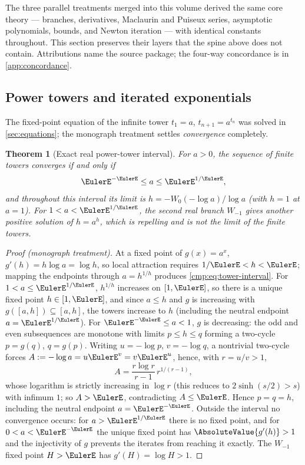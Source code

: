 \documentclass[11pt]{article}
\newtheorem{theorem}{Theorem}[section]
\theoremstyle{remark}
\begin{document}
The three parallel treatments merged into this volume derived the same core
theory --- branches, derivatives, Maclaurin and Puiseux series, asymptotic
polynomials, bounds, and Newton iteration --- with identical constants
throughout.  This section preserves their layers that the spine above does
not contain.  Attributions name the source package; the four-way concordance
is in \cref{app:concordance}.

\subsection{Power towers and iterated exponentials}

The fixed-point equation of the infinite tower
\(t_1=a\), \(t_{n+1}=a^{t_n}\) was solved in
\cref{sec:equations}; the monograph treatment settles \emph{convergence}
completely.

\begin{theorem}[Exact real power-tower interval]\label{cmp:thm:powertower}
For \(a>0\), the sequence of finite towers converges if and only if
\begin{equation}\label{cmp:eq:tower-interval}
 \EulerE^{-\EulerE}\le a\le\EulerE^{1/\EulerE},
\end{equation}
and throughout this interval its limit is
\(h=-W_0(-\log a)/\log a\) (with \(h=1\) at \(a=1\)).  For
\(1<a<\EulerE^{1/\EulerE}\), the second real branch \(W_{-1}\) gives another positive
solution of \(h=a^h\), which is repelling and is not the limit of the finite
towers.
\end{theorem}

\begin{proof}[Proof (monograph treatment)]
At a fixed point of \(g(x)=a^x\), \(g'(h)=h\log a=\log h\), so local
attraction requires \(1/\EulerE<h<\EulerE\); mapping the endpoints through
\(a=h^{1/h}\) produces \eqref{cmp:eq:tower-interval}.  For
\(1<a\le\EulerE^{1/\EulerE}\), \(h^{1/h}\) increases on \([1,\EulerE]\), so there is a
unique fixed point \(h\in[1,\EulerE]\), and since \(a\le h\) and \(g\) is
increasing with \(g([a,h])\subseteq[a,h]\), the towers increase to \(h\)
(including the neutral endpoint \(a=\EulerE^{1/\EulerE}\)).  For
\(\EulerE^{-\EulerE}\le a<1\), \(g\) is decreasing: the odd and even subsequences
are monotone with limits \(p\le h\le q\) forming a two-cycle
\(p=g(q)\), \(q=g(p)\).  Writing \(u=-\log p\), \(v=-\log q\), a nontrivial
two-cycle forces \(A:=-\log a=u\EulerE^v=v\EulerE^u\), hence, with \(r=u/v>1\),
\[
 A=\frac{r\log r}{r-1}\,r^{1/(r-1)},
\]
whose logarithm is strictly increasing in \(\log r\) (this reduces to
\(2\sinh(s/2)>s\)) with infimum \(1\); so \(A>\EulerE\), contradicting
\(A\le\EulerE\).  Hence \(p=q=h\), including the neutral endpoint
\(a=\EulerE^{-\EulerE}\).  Outside the interval no convergence occurs: for
\(a>\EulerE^{1/\EulerE}\) there is no fixed point, and for \(0<a<\EulerE^{-\EulerE}\) the
unique fixed point has \(\AbsoluteValue{g'(h)}>1\) and the injectivity of \(g\)
prevents the iterates from reaching it exactly.  The \(W_{-1}\) fixed point
\(H>\EulerE\) has \(g'(H)=\log H>1\).
\end{proof}
\end{document}
